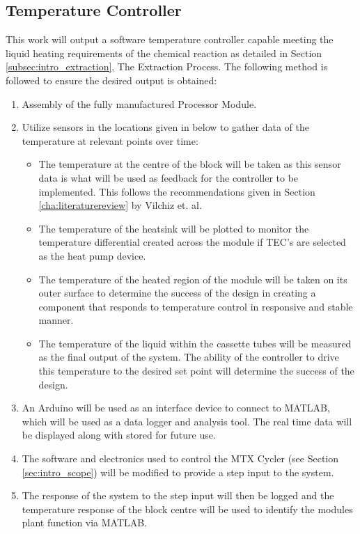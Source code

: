 \subsection{Temperature Controller}

This work will output a software temperature controller capable meeting the liquid heating requirements of the chemical reaction as detailed in Section \ref{subsec:intro_extraction}, The Extraction Process. The following method is followed to ensure the desired output is obtained:
\begin{enumerate}
	\item Assembly of the fully manufactured Processor Module.
	\item Utilize sensors in the locations given in below to gather data of the temperature at relevant points over time:
	\begin{itemize}
		\item The temperature at the centre of the block will be taken as this sensor data is what will be used as feedback for the controller to be implemented. This follows the recommendations given in Section \ref{cha:literaturereview} by Vilchiz et. al.
		\item The temperature of the heatsink will be plotted to monitor the temperature differential created across the module if TEC's are selected as the heat pump device.
		\item The temperature of the heated region of the module will be taken on its outer surface to determine the success of the design in creating a component that responds to temperature control in responsive and stable manner.
		\item The temperature of the liquid within the cassette tubes will be measured as the final output of the system. The ability of the controller to drive this temperature to the desired set point will determine the success of the design.
	\end{itemize}
	\item An Arduino will be used as an interface device to connect to MATLAB, which will be used as a data logger and analysis tool. The real time data will be displayed along with stored for future use.
	\item The software and electronics used to control the MTX Cycler (see Section \ref{sec:intro_scope}) will be modified to provide a step input to the system.
	\item The response of the system to the step input will then be logged and the temperature response of the block centre will be used to identify the modules plant function via MATLAB.

\end{enumerate}
